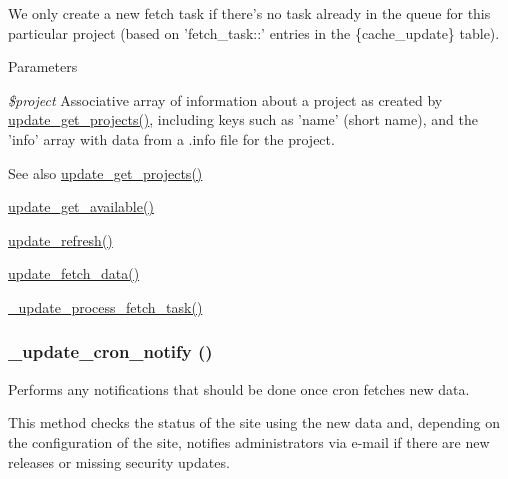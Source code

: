 We only create a new fetch task if there's no task already in the queue for this particular project (based on 'fetch\_\-task::' entries in the \{cache\_\-update\} table).


\begin{DoxyParams}{Parameters}
\item[{\em \$project}]Associative array of information about a project as created by \hyperlink{update_8compare_8inc_a7e1ea49d91f2d2b81b8101d481d10300}{update\_\-get\_\-projects()}, including keys such as 'name' (short name), and the 'info' array with data from a .info file for the project.\end{DoxyParams}
\begin{DoxySeeAlso}{See also}
\hyperlink{update_8compare_8inc_a7e1ea49d91f2d2b81b8101d481d10300}{update\_\-get\_\-projects()} 

\hyperlink{update_8module_a683663ab0739a0d67fe3eb98f532c11c}{update\_\-get\_\-available()} 

\hyperlink{update_8module_a601f9ec9c404ec41711b00884e7d0573}{update\_\-refresh()} 

\hyperlink{update_8module_a88528fa85108af5a0b26ab5b1d6fa8c2}{update\_\-fetch\_\-data()} 

\hyperlink{update_8fetch_8inc_a49b627a7dcb3c714f088bc0e7ef40e85}{\_\-update\_\-process\_\-fetch\_\-task()} 
\end{DoxySeeAlso}
\hypertarget{update_8fetch_8inc_a55d78e25faf69f49cfc88f2642c06f4e}{
\subsubsection[{\_\-update\_\-cron\_\-notify}]{\setlength{\rightskip}{0pt plus 5cm}\_\-update\_\-cron\_\-notify ()}}
\label{update_8fetch_8inc_a55d78e25faf69f49cfc88f2642c06f4e}
Performs any notifications that should be done once cron fetches new data.

This method checks the status of the site using the new data and, depending on the configuration of the site, notifies administrators via e-\/mail if there are new releases or missing security updates.

